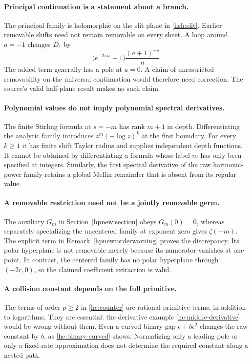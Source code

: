 \documentclass[11pt,a4paper]{article}
\numberwithin{equation}{section}
\theoremstyle{definition}
\theoremstyle{remark}
\newcommand{\ii}{\mathrm i}
\begin{document}
\paragraph{Principal continuation is a statement about a branch.}
The principal family is holomorphic on the slit plane in
\eqref{hsh:slit}. Earlier removable shifts need not remain removable
on every sheet. A loop around $a=-1$ changes $D_1$ by
\[
 \bigl(e^{-2\pi\ii s}-1\bigr)\frac{(a+1)^{-s}}a.
\]
The added term generally has a pole at $a=0$. A claim of unrestricted
removability on the universal continuation would therefore need
correction. The source's valid half-plane result makes no such claim.

\paragraph{Polynomial values do not imply polynomial spectral derivatives.}
The finite Stirling formula at $s=-m$ has rank $m+1$ in depth.
Differentiating the analytic family introduces
$z^m(-\log z)^k$ at the first boundary. For every $k\ge1$ it has
finite shift Taylor radius and supplies independent depth functions.
It cannot be obtained by differentiating a formula whose label $m$
has only been specified at integers. Similarly, the first spectral
derivative of the raw harmonic-power family retains a global Mellin
remainder that is absent from its regular value.

\paragraph{A removable restriction need not be a jointly removable germ.}
The auxiliary $G_m$ in Section~\ref{hpnew:section} obeys $G_m(0)=0$,
whereas separately specializing the uncentered family at exponent zero
gives $\zeta(-m)$. The explicit term in
Remark~\ref{hpnew:orderwarning} proves the discrepancy. Its polar
hyperplane is not removable merely because its numerator vanishes at
one point. In contrast, the centered family has no polar hyperplane
through $(-2r,0)$, so the claimed coefficient extraction is valid.

\paragraph{A collision constant depends on the full primitive.}
The terms of order $p\ge2$ in \eqref{hc:counter} are rational
primitive terms, in addition to logarithms. They are essential:
the derivative example \eqref{hc:middle-derivative} would be wrong
without them. Even a curved binary gap $\epsilon+b\epsilon^2$
changes the raw constant by $b$, as
\eqref{hc:binary-curved} shows. Normalizing only a leading pole or
only a fixed-rate approximation does not determine the required
constant along a nested path.
\end{document}
